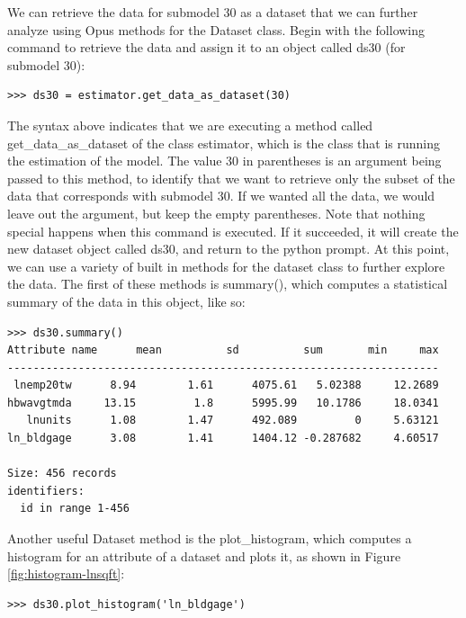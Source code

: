 We can retrieve the data for submodel 30 as a dataset that
we can further analyze using Opus methods for the Dataset
class.  Begin with the following command to retrieve the
data and assign it to an object called ds30 (for submodel
30):

\begin{verbatim}
>>> ds30 = estimator.get_data_as_dataset(30)
\end{verbatim}

The syntax above indicates that we are executing a method
called get\_data\_as\_dataset of the class estimator, which
is the class that is running the estimation of the model.
The value 30 in parentheses is an argument being passed to
this method, to identify that we want to retrieve only the
subset of the data that corresponds with submodel 30.  If we
wanted all the data, we would leave out the argument, but
keep the empty parentheses.  Note that nothing special
happens when this command is executed.  If it succeeded, it
will create the new dataset object called ds30, and return
to the python prompt.  At this point, we can use a variety
of built in methods for the dataset class to further explore
the data.  The first of these methods is summary(), which
computes a statistical summary of the data in this object,
like so:
\\

\begin{verbatim}
>>> ds30.summary()
Attribute name	    mean	      sd	      sum	    min	    max
-------------------------------------------------------------------
 lnemp20tw	    8.94	    1.61	  4075.61	5.02388		12.2689
hbwavgtmda	   13.15	     1.8	  5995.99	10.1786		18.0341
   lnunits	    1.08	    1.47	  492.089	      0		5.63121
ln_bldgage	    3.08	    1.41	  1404.12 -0.287682		4.60517

Size: 456 records
identifiers:
  id in range 1-456
\end{verbatim}


Another useful Dataset method is the plot\_histogram, which
computes a histogram for an attribute of a dataset and plots
it, as shown in Figure \ref{fig:histogram-lnsqft}:
\\

\begin{verbatim}
>>> ds30.plot_histogram('ln_bldgage')
\end{verbatim}

